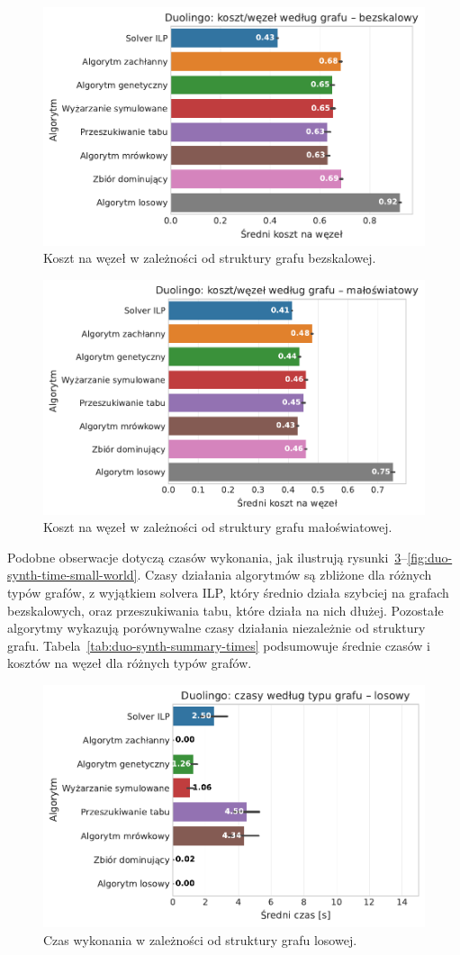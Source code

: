 \begin{figure}[H]
  \centering
  \includegraphics[width=0.65\linewidth]{assets/figures/benchmark/synthetic/duolingo_cost_per_node_by_graph_scale_free.pdf}
  \caption{Koszt na węzeł w zależności od struktury grafu bezskalowej.}
  \label{fig:duo-synth-cost-scale-free}
\end{figure}

\begin{figure}[H]
  \centering
  \includegraphics[width=0.65\linewidth]{assets/figures/benchmark/synthetic/duolingo_cost_per_node_by_graph_small_world.pdf}
  \caption{Koszt na węzeł w zależności od struktury grafu małoświatowej.}
  \label{fig:duo-synth-cost-small-world}
\end{figure}

Podobne obserwacje dotyczą czasów wykonania, jak ilustrują rysunki~\ref{fig:duo-synth-time-random}--\ref{fig:duo-synth-time-small-world}. Czasy działania algorytmów są zbliżone dla różnych typów grafów, z wyjątkiem solvera ILP, który średnio działa szybciej na grafach bezskalowych, oraz przeszukiwania tabu, które działa na nich dłużej. Pozostałe algorytmy wykazują porównywalne czasy działania niezależnie od struktury grafu. Tabela~\ref{tab:duo-synth-summary-times} podsumowuje średnie czasów i kosztów na węzeł dla różnych typów grafów.

\begin{figure}[H]
  \centering
  \includegraphics[width=0.65\linewidth]{assets/figures/benchmark/synthetic/duolingo_time_by_graph_random.pdf}
  \caption{Czas wykonania w zależności od struktury grafu losowej.}
  \label{fig:duo-synth-time-random}
\end{figure}

